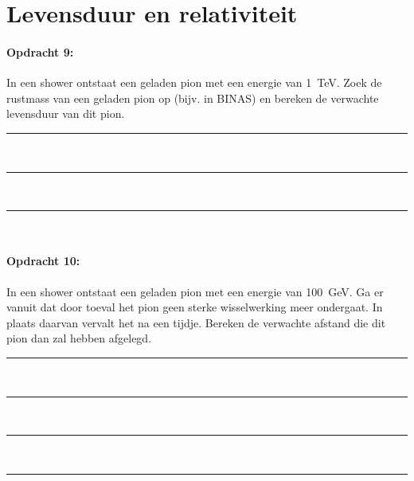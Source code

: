 \section{Levensduur en relativiteit}

\begin{minipage}[t]{1\columnwidth}
\paragraph{Opdracht 9:}
In een shower ontstaat een geladen pion met een energie van
\SI{1}{\tera\electronvolt}. Zoek de rustmass van een geladen pion op
(bijv. in BINAS) en bereken de verwachte levensduur van dit pion.
\begin{center}
    \rule{\textwidth}{0.3mm}\\
    \rule{\textwidth}{0.3mm}\\
    \rule{\textwidth}{0.3mm}\\
\end{center}
\end{minipage}
\bigskip{}

\begin{minipage}[t]{1\columnwidth}
\paragraph{Opdracht 10:}
In een shower ontstaat een geladen pion met een energie van
\SI{100}{\giga\electronvolt}. Ga er vanuit dat door toeval het pion geen
sterke wisselwerking meer ondergaat. In plaats daarvan vervalt het na
een tijdje. Bereken de verwachte afstand die dit pion dan zal hebben
afgelegd.  
\begin{center}
    \rule{\textwidth}{0.3mm}\\
    \rule{\textwidth}{0.3mm}\\
    \rule{\textwidth}{0.3mm}\\
    \rule{\textwidth}{0.3mm}\\
\end{center}
\end{minipage}
\bigskip{}


